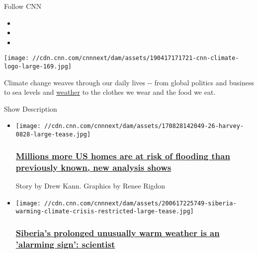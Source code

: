 Follow CNN

\begin{itemize}
\item
\item
\item
\end{itemize}

\texttt{[image: //cdn.cnn.com/cnnnext/dam/assets/190417171721-cnn-climate-logo-large-169.jpg]}

Climate change weaves through our daily lives -\/- from global politics
and business to sea levels and \href{https://cnn.it/2VcbOBV}{weather} to
the clothes we wear and the food we eat.

Show Description

\begin{itemize}
\item
  \href{/2020/06/29/us/us-flood-risk-increasing-climate-change-first-street-foundation/index.html}{}

  \texttt{[image: //cdn.cnn.com/cnnnext/dam/assets/170828142049-26-harvey-0828-large-tease.jpg]}

  \hypertarget{millions-more-us-homes-are-at-risk-of-flooding-than-previously-known-new-analysis-shows}{%
  \subsubsection{\texorpdfstring{\href{/2020/06/29/us/us-flood-risk-increasing-climate-change-first-street-foundation/index.html}{\textbf{Millions
  more US homes are at risk of flooding than previously known, new
  analysis
  shows}}}{Millions more US homes are at risk of flooding than previously known, new analysis shows}}\label{millions-more-us-homes-are-at-risk-of-flooding-than-previously-known-new-analysis-shows}}

  Story by Drew Kann. Graphics by Renee Rigdon
\item
  \href{/2020/06/18/europe/siberia-warming-climate-crisis-intl-hnk/index.html}{}

  \texttt{[image: //cdn.cnn.com/cnnnext/dam/assets/200617225749-siberia-warming-climate-crisis-restricted-large-tease.jpg]}

  \hypertarget{siberias-prolonged-unusually-warm-weather-is-an-alarming-sign-scientist}{%
  \subsubsection{\texorpdfstring{\href{/2020/06/18/europe/siberia-warming-climate-crisis-intl-hnk/index.html}{Siberia's
  prolonged unusually warm weather is an 'alarming sign':
  scientist}}{Siberia's prolonged unusually warm weather is an 'alarming sign': scientist}}\label{siberias-prolonged-unusually-warm-weather-is-an-alarming-sign-scientist}}
\end{itemize}

